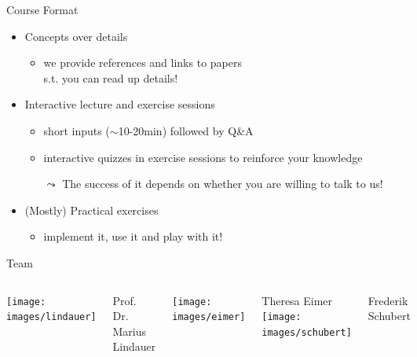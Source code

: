 \documentclass[aspectratio=169]{./latex_main/tntbeamer}  %
\begin{document}
\begin{frame}[c]{Course Format}
	
	\begin{itemize}
		\item Concepts over details
		\begin{itemize}
			\item we provide references and links to papers\\ s.t. you can read up details!
		\end{itemize}
		\smallskip
		\item Interactive lecture and exercise sessions
		\begin{itemize}
			\item short inputs ($\sim$10-20min) followed by Q\&A
			\item interactive quizzes in exercise sessions to reinforce your knowledge
			\item[$\leadsto$] The success of it depends on whether you are willing to talk to us! 
		\end{itemize}
		\smallskip
		\item (Mostly) Practical exercises
		\begin{itemize}
			\item implement it, use it and play with it!
		\end{itemize}
	\end{itemize}
	
\end{frame}
\begin{frame}[c]{Team}
	
	\begin{columns}[T]
		
		\centering
		\texttt{[image: images/lindauer]}
		
		Prof. Dr.\\ Marius Lindauer
		
		\centering
		\texttt{[image: images/eimer]}
		
		Theresa Eimer\\
		
		\centering
		\texttt{[image: images/schubert]}
		
		Frederik Schubert \\
		
		
	\end{columns}
	
	
\end{frame}
\end{document}
